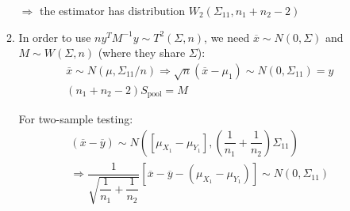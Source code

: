 \begin{enumerate}[label=\arabic*., leftmargin=*]
\begin{enumerate}[label=\alph*),leftmargin=*]
      $\Rightarrow$ the estimator has distribution $W_2(\Sigma_{11},n_1+n_2-2)$ 
      \par\bigskip
    \item In order to use $ny^TM^{-1}y\sim T^2(\Sigma,n)$, we need $\overline{x}\sim N(0,\Sigma)$ and $M\sim W(\Sigma,n)$ (where they share $\Sigma$):
      \begin{equation*}
        \begin{gathered}
          \overline{x}\sim N(\mu,\Sigma_{11}/n)\Rightarrow \sqrt{n}(\overline{x}-\mu_1)\sim N(0,\Sigma_{11}) = y\\
          (n_1+n_2-2)S_{\text{pool}} = M
        \end{gathered}
      \end{equation*}
      \par\bigskip
      \noindent For two-sample testing:
      \begin{equation*}
        \begin{gathered}
          (\overline{x}-\overline{y})\sim N\left([\mu_{X_1}-\mu_{Y_1}],\left(\dfrac{1}{n_1}+\dfrac{1}{n_2}\right)\Sigma_{11}\right)\\
          \Rightarrow \dfrac{1}{\sqrt{\dfrac{1}{n_1}+\dfrac{1}{n_2}}}\left[\overline{x}-\overline{y}-(\mu_{X_1}-\mu_{Y_1})\right]\sim N(0,\Sigma_{11})
        \end{gathered}
      \end{equation*}
  \end{enumerate}
\end{enumerate}

